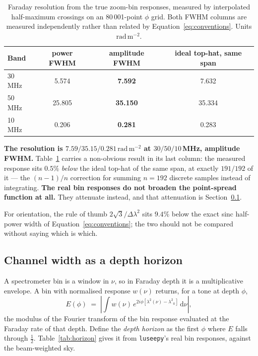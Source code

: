 \documentclass[11pt]{article}
\newcommand{\rmu}{\ensuremath{\mathrm{rad\,m^{-2}}}}
\newcommand{\lamsq}{\ensuremath{\lambda^{2}}}
\newcommand{\code}[1]{\texttt{#1}}
\begin{document}
\begin{table}[htbp]
  \centering
  \caption{Faraday resolution from the true zoom-bin responses,
  measured by interpolated half-maximum crossings on an 80\,001-point
  $\phi$ grid. Both FWHM columns are measured independently rather than
  related by Equation~\eqref{eq:conventions}. Units \rmu.}
  \label{tab:rmsf}
  \begin{tabular}{lccc}
    \toprule
    Band & power FWHM & \textbf{amplitude FWHM} & ideal top-hat, same span \\
    \midrule
    30\,MHz & 5.574  & \textbf{7.592}  & 7.632 \\
    50\,MHz & 25.805 & \textbf{35.150} & 35.334 \\
    10\,MHz & 0.206  & \textbf{0.281}  & 0.283 \\
    \bottomrule
  \end{tabular}
\end{table}

\textbf{The resolution is $7.59 / 35.15 / 0.281$\,\rmu{} at
$30/50/10$\,MHz, amplitude FWHM.} Table~\ref{tab:rmsf} carries a
non-obvious result in its last column: the measured response sits
$0.5\%$ \emph{below} the ideal top-hat of the same span, at exactly
$191/192$ of it --- the $(n-1)/n$ correction for summing $n = 192$
discrete samples instead of integrating. \textbf{The real bin responses
do not broaden the point-spread function at all.} They attenuate
instead, and that attenuation is Section~\ref{sec:horizon}.

For orientation, the rule of thumb $2\sqrt3/\Delta\lamsq$
\citep{brentjens2005} sits $9.4\%$ below the exact sinc half-power width
of Equation~\eqref{eq:conventions}; the two should not be compared
without saying which is which.

\subsection{Channel width as a depth horizon}
\label{sec:horizon}

A spectrometer bin is a window in $\nu$, so in Faraday depth it is a
multiplicative envelope. A bin with normalised response $w(\nu)$ returns,
for a tone at depth $\phi$,
\begin{equation}
  E(\phi) \;=\;
  \left|\int w(\nu)\, e^{2i\phi\left[\lamsq(\nu)-\lamsq_0\right]}\,
  \mathrm d\nu\right| ,
  \label{eq:envelope}
\end{equation}
the modulus of the Fourier transform of the bin response evaluated at the
Faraday rate of that depth. Define the \emph{depth horizon} as the first
$\phi$ where $E$ falls through $\tfrac12$.
Table~\ref{tab:horizon} gives it from \code{luseepy}'s real bin
responses, against the beam-weighted sky.
\end{document}
